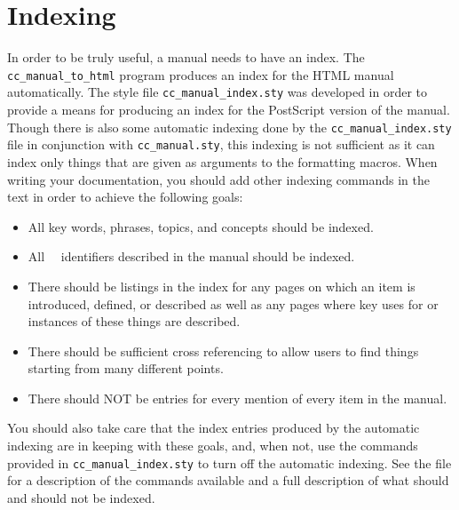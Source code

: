 \section{Indexing}
\label{sec:indexing}

In order to be truly useful, a manual needs to have an index.  The 
{\tt cc\_manual\_to\_html} program produces an index for the HTML manual
automatically.  %
The style file {\tt cc\_manual\_index.sty}%
 was developed in order to provide
a means for producing an index for the PostScript version of the manual.  
Though there is also some automatic indexing done by the
{\tt cc\_manual\_index.sty} file in conjunction with {\tt cc\_manual.sty},
this indexing is not sufficient as it can index only things that are
given as arguments to the formatting macros.  When writing your
documentation, you should add other indexing commands in the text in
order to achieve the following goals:
\begin{itemize}
   \item All key words, phrases, topics, and concepts should be indexed.
   \item All \cgal\ \CC\ identifiers described in the manual should be indexed.
   \item There should be listings in the index for any pages on which an
         item is introduced, defined, or described as well as any pages
         where key uses for or instances of these things are described.
   \item There should be sufficient cross referencing to allow users
         to find things starting from many different points.
   \item There should NOT be entries for every mention of every item in the
         manual.
\end{itemize}

You should also take care that the index entries produced by the automatic
indexing are in keeping with these goals, and, when not, use the commands
provided in {\tt cc\_manual\_index.sty} to turn off the automatic indexing.
See the file 
for a description of the commands available and a full description of what
should and should not be indexed.

